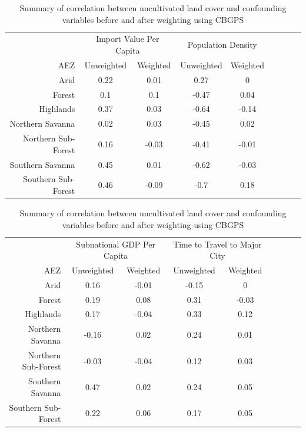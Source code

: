 \documentclass{article}
\begin{document}
\begin{table}[h!]
	\begin{center}
		\begin{tabular}{r | c c c c c c c c }
	&	\multicolumn{2}{c}{Import Value Per Capita}			&	\multicolumn{2}{c}{Population Density}			\\
	\cmidrule(lr){2-3}\cmidrule(lr){4-5}
AEZ	&	Unweighted	&	Weighted	&	Unweighted	&	Weighted	\\
\hline									
Arid	&	0.22	&	0.01	&	0.27	&	0	\\
Forest	&	0.1	&	0.1	&	-0.47	&	0.04	\\
Highlands	&	0.37	&	0.03	&	-0.64	&	-0.14	\\
Northern Savanna	&	0.02	&	0.03	&	-0.45	&	0.02	\\
Northern Sub-Forest	&	0.16	&	-0.03	&	-0.41	&	-0.01	\\
Southern Savanna	&	0.45	&	0.01	&	-0.62	&	-0.03	\\
Southern Sub-Forest	&	0.46	&	-0.09	&	-0.7	&	0.18	\\	
		\end{tabular}
	\caption{Summary of correlation between uncultivated land cover and confounding variables before and after weighting using CBGPS}
	\label{tab:CBPSsum1}
	\end{center}
\end{table}

\begin{table}[h!]
	\begin{center}
		\begin{tabular}{r | c c c c c c c c }
			\cmidrule(lr){2-3}\cmidrule(lr){4-5}
	&	\multicolumn{2}{c}{Subnational GDP Per Capita}			&	\multicolumn{2}{c}{Time to Travel to Major City}			\\
	\cmidrule(lr){2-3}\cmidrule(lr){4-5}
AEZ	&	Unweighted	&	Weighted	&	Unweighted	&	Weighted	\\
\hline									
Arid	&	0.16	&	-0.01	&	-0.15	&	0	\\
Forest	&	0.19	&	0.08	&	0.31	&	-0.03	\\
Highlands	&	0.17	&	-0.04	&	0.33	&	0.12	\\
Northern Savanna	&	-0.16	&	0.02	&	0.24	&	0.01	\\
Northern Sub-Forest	&	-0.03	&	-0.04	&	0.12	&	0.03	\\
Southern Savanna	&	0.47	&	0.02	&	0.24	&	0.05	\\
Southern Sub-Forest	&	0.22	&	0.06	&	0.17	&	0.05	\\
\end{tabular}
\caption{Summary of correlation between uncultivated land cover and confounding variables before and after weighting using CBGPS}
\label{tab:CBPSsum2}
\end{center}
\end{table}
\end{document}
